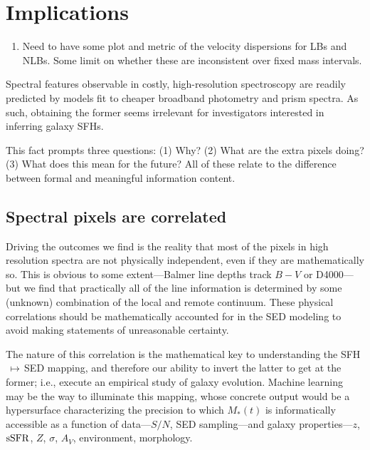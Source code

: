 \documentclass[a4paper,fleqn,usenatbib]{mnras}
\newcommand{\Mstel}{M_\ast}
\newcommand{\ssfr}{{\rm sSFR}}
\newcommand{\benum}{\begin{enumerate}}
\newcommand{\eenum}{\end{enumerate}}
\begin{document}

\section{Implications}
\label{sec:discussion}

\benum
	\item Need to have some plot and metric of the velocity dispersions for LBs and NLBs. Some
		limit on whether these are inconsistent over fixed mass intervals.
\eenum


Spectral features observable in costly, high-resolution spectroscopy are readily predicted by 
models fit to cheaper broadband photometry and prism spectra. As such, obtaining the former 
seems irrelevant for investigators interested in inferring galaxy SFHs.

This fact prompts three questions: (1) Why? (2) What are the extra pixels doing? (3) What does
this mean for the future? All of these relate to the difference between formal and meaningful 
information content.

\subsection{Spectral pixels are correlated}
\label{sec:pixels}

Driving the outcomes we find is the reality that most of the pixels in high resolution 
spectra are not physically independent, even if they are mathematically so. This is obvious to 
some extent---Balmer line depths track $B-V$ or D4000---but we find that practically all of the 
line information is determined by some (unknown) combination of the local and remote 
continuum. These physical correlations should be mathematically accounted for in the SED 
modeling to avoid making statements of unreasonable certainty.

The nature of this correlation is the mathematical key to understanding the SFH$\,\mapsto\,$SED 
mapping, and therefore our ability to invert the latter to get at the former; i.e., execute an empirical 
study of galaxy evolution. Machine learning may be the way to illuminate this mapping, whose concrete 
output would be a hypersurface characterizing the precision to which $\Mstel(t)$ is informatically 
accessible as a function of data---$S/N$, SED sampling---and galaxy properties---$z$, $\ssfr$, $Z$, 
$\sigma$, $A_{V}$, environment, morphology. 
\end{document}
